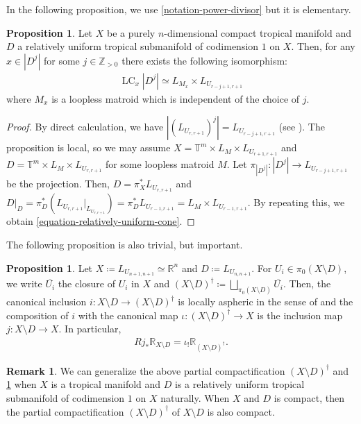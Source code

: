 \documentclass[a4paper,dvipdfmx,reqno,12pt]{amsart}
\theoremstyle{definition}
\newtheorem{proposition}[theorem]{Proposition}
\newtheorem{remark}[theorem]{Remark}
\newcommand{\deq}{\coloneqq}
\newcommand{\opn}[1]{\operatorname{#1}}
\numberwithin{equation}{section}
\begin{document}
In the following proposition, we use
\cref{notation-power-divisor} but it is elementary.
\begin{proposition}
Let $X$ be a purely $n$-dimensional compact tropical manifold
and $D$ a relatively uniform tropical submanifold of
codimension $1$ on $X$.
Then, for any $x\in |D^{j}|$ for some $j\in \mathbb{Z}_{>0}$
there exists the following isomorphism:
\begin{align}
\label{equation-relatively-uniform-cone}
\opn{LC}_x |D^{j}|\simeq 
L_{M_{x}}
\times L_{U_{r-j+1,r+1}}
\end{align}
where $M_x$ is a loopless matroid which is independent of
the choice of $j$.
\end{proposition}
\begin{proof}
By direct calculation, we have 
$|(L_{U_{r,r+1}})^{j}|=L_{U_{r-j+1,r+1}}$
(see \cite[Example 3.9]{MR2591823}).
The proposition is local, so we may assume 
$X=\mathbb{T}^{m}\times L_{M}\times L_{U_{r+1,r+1}}$ and 
$D=\mathbb{T}^{m}\times 
L_{M}\times L_{U_{r,r+1}}$
for some loopless matroid $M$.
Let $\pi_{|D^j|} \colon |D^{j}|\to L_{U_{r-j+1,r+1}}$
be the projection.
Then, $D=\pi_{X}^*L_{U_{r,r+1}}$ and 
$D|_D=\pi_D^{*}(L_{U_{r,r+1}}|_{L_{U_{r,r+1}}})
=\pi_D^{*}L_{U_{r-1,r+1}}=L_{M}\times L_{U_{r-1,r+1}}$.
By repeating this, we obtain
\eqref{equation-relatively-uniform-cone}.
\end{proof}

The following proposition is also trivial,
but important.

\begin{proposition}
\label{proposition-cpt-complement}
Let $X\deq L_{U_{n+1,n+1}}\simeq \mathbb{R}^n$ and
$D\deq L_{U_{n,n+1}}$. 
For $U_i\in \pi_0(X\setminus D)$, we write 
$\overline{U_i}$ the closure of $U_i$ in $X$
and $(X\setminus D)^{\dagger}\deq \bigsqcup_{\pi_0(X\setminus D)}
\overline{U_i}$.
Then, the canonical inclusion
$i\colon X\setminus D\to
(X\setminus D)^{\dagger}$ is
locally aspheric in the sense of
\cite[Chapter V. Corollary 1.3.2]{MR3838359} and
the composition of $i$ with
the canonical map $\iota\colon
(X\setminus D)^{\dagger}\to X$ is the inclusion 
map $j\colon X\setminus D\to X$. 
In particular,
\begin{align}
Rj_*\mathbb{R}_{X\setminus D}=\iota_!
\mathbb{R}_{(X\setminus D)^{\dagger}}.
\end{align}

\end{proposition}

\begin{remark}
We can generalize 
the above partial compactification
$(X\setminus D)^{\dagger}$ and 
\cref{proposition-cpt-complement} when
$X$ is a tropical manifold and $D$ is a
relatively uniform tropical submanifold of codimension
$1$ on $X$ naturally.
When $X$ and $D$ is compact, then the partial compactification
$(X\setminus D)^{\dagger}$ of $X\setminus D$
is also compact. 
\end{remark}
\end{document}
